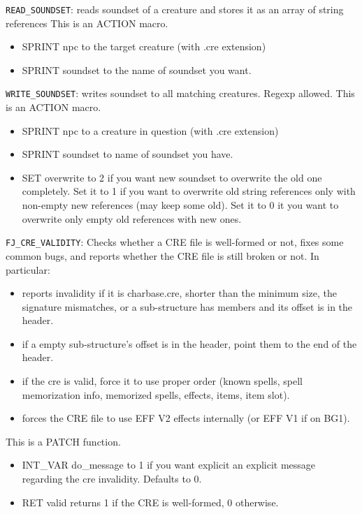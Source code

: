 \documentclass{article}
\begin{document}
\verb+READ_SOUNDSET+: reads soundset of a creature and stores it as an array of string references %
This is an ACTION macro.
\begin{itemize}
\item SPRINT npc to the target creature (with .cre extension)
\item SPRINT soundset to the name of soundset you want.
\end{itemize}

\verb+WRITE_SOUNDSET+: writes soundset to all matching creatures. Regexp allowed.
This is an ACTION macro.
\begin{itemize}
\item SPRINT npc to a creature in question (with .cre extension)
\item SPRINT soundset to name of soundset you have.
\item SET overwrite to 2 if you want new soundset to overwrite the old one completely. Set it to 1 if you want to overwrite old string references only with non-empty new references (may keep some old). Set it to 0 it you want to overwrite only empty old references with new ones.
\end{itemize}

\verb+FJ_CRE_VALIDITY+: Checks whether a CRE file is well-formed or not, fixes some common bugs, and reports whether the CRE file is still broken or not. In particular:
\begin{itemize}
\item reports invalidity if it is charbase.cre, shorter than the minimum size, the signature mismatches, or a sub-structure has members and its offset is in the header.
\item if a empty sub-structure's offset is in the header, point them to the end of the header.
\item if the cre is valid, force it to use proper order (known spells, spell memorization info, memorized spells, effects, items, item slot).
\item forces the CRE file to use EFF V2 effects internally (or EFF V1 if on BG1).
\end{itemize}
This is a PATCH function.
\begin{itemize}
\item INT_VAR do_message to 1 if you want explicit an explicit message regarding the cre invalidity. Defaults to 0.
\item RET valid returns 1 if the CRE is well-formed, 0 otherwise.
\end{itemize}
\end{document}
